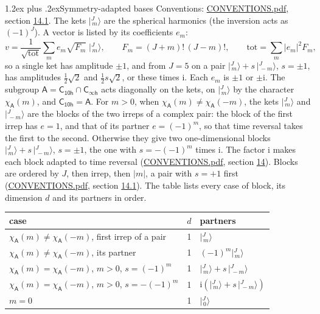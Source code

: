 \documentclass[10pt,a4paper]{article}
\makeatletter
\renewcommand\section{\@startsection{section}{1}{\z@}{-3ex plus -1ex minus -.2ex}%
  {1.2ex plus .2ex}{\normalfont\large\sffamily\bfseries\color{parttitle}}}
\numberwithin{equation}{section}
\newcommand{\grp}[1]{\mathsf{#1}}
\newcommand{\iunit}{\mathrm{i}}
\newcommand{\chiA}{\chi_{\grp{A}}}
\newcommand{\jm}[2]{\bigl\lvert{}^{#1}_{\,#2}\bigr\rangle}
\makeatother
\begin{document}
\section{Symmetry-adapted bases}\label{s:bases}
Conventions: \href{../../CONVENTIONS.pdf}{CONVENTIONS.pdf}, section \href{../../CONVENTIONS.pdf\#conv.14.1}{14.1}.
\leavevmode\label{n:index.m}\label{n:vector.ket}The kets $\jm{J}{m}$ are the spherical harmonics (the inversion acts as $(-1)^J$). \label{n:index.ketcoefficient}\label{n:vector.basis.symmetry}\label{n:index.ketweight}\label{n:index.total}A vector is listed by its coefficients $e_m$:
\begin{equation}\label{e:ket}v = \frac{1}{\sqrt{\mathrm{tot}}}\sum_m e_m\sqrt{F_m}\;\jm{J}{m},\qquad F_m = (J+m)!\,(J-m)!,\qquad \mathrm{tot} = \sum_m |e_m|^2F_m,\end{equation}
\leavevmode\label{n:index.pair.sign}so a single ket has amplitude $\pm1$, and from $J = 5$ on a pair $\jm{J}{m} + s\,\jm{J}{-m}$, $s = \pm1$, has amplitudes $\tfrac{1}{2}\sqrt{2}$ and $\tfrac{1}{2}s\sqrt{2}$, or these times $\iunit$. Each $e_m$ is $\pm1$ or $\pm\iunit$.
\leavevmode\label{n:group.A}\label{n:function.character.abelian}The subgroup $\grp{A} = \grp{C_{10h}}\cap\grp{C_{\infty h}}$ acts diagonally on the kets, on $\jm{J}{m}$ by the character $\chiA(m)$, and $\grp{C_{10h}} = \grp{A}$. For $m > 0$, when $\chiA(m) \ne \chiA(-m)$, the kets $\jm{J}{m}$ and $\jm{J}{-m}$ are the blocks of the two irreps of a complex pair: the block of the first irrep has $e = 1$, and that of its partner $e = (-1)^m$, so that time reversal takes the first to the second. Otherwise they give two one-dimensional blocks $\jm{J}{m} + s\,\jm{J}{-m}$, $s = \pm1$, the one with $s = -(-1)^m$ times $\iunit$. The factor $\iunit$ makes each block adapted to time reversal (\href{../../CONVENTIONS.pdf}{CONVENTIONS.pdf}, section \href{../../CONVENTIONS.pdf\#conv.14}{14}). Blocks are ordered by $J$, then irrep, then $|m|$, a pair with $s = +1$ first (\href{../../CONVENTIONS.pdf}{CONVENTIONS.pdf}, section \href{../../CONVENTIONS.pdf\#conv.14.1}{14.1}).
\leavevmode\label{n:head.case}\label{n:head.partners}The table lists every case of block, its dimension $d$ and its partners in order.
\begin{center}\begin{tabular}{@{}lrl@{}}\toprule
case & $d$ & partners\\\midrule
$\chiA(m) \ne \chiA(-m)$, first irrep of a pair & 1 & $\jm{J}{m}$\\
$\chiA(m) \ne \chiA(-m)$, its partner & 1 & $(-1)^m\jm{J}{m}$\\
$\chiA(m) = \chiA(-m)$, $m > 0$, $s = (-1)^m$ & 1 & $\jm{J}{m} + s\,\jm{J}{-m}$\\
$\chiA(m) = \chiA(-m)$, $m > 0$, $s = -(-1)^m$ & 1 & $\iunit(\jm{J}{m} + s\,\jm{J}{-m})$\\
$m = 0$ & 1 & $\jm{J}{0}$\\
\bottomrule\end{tabular}\end{center}
\end{document}
